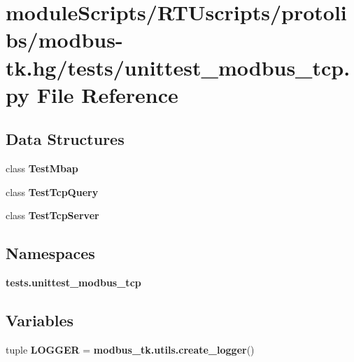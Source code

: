 \section{module\+Scripts/\+R\+T\+Uscripts/protolibs/modbus-\/tk.hg/tests/unittest\+\_\+modbus\+\_\+tcp.py File Reference}
\label{unittest__modbus__tcp_8py}
\subsection*{Data Structures}
\begin{DoxyCompactItemize}
\item 
class {\bf Test\+Mbap}
\item 
class {\bf Test\+Tcp\+Query}
\item 
class {\bf Test\+Tcp\+Server}
\end{DoxyCompactItemize}
\subsection*{Namespaces}
\begin{DoxyCompactItemize}
\item 
 {\bf tests.\+unittest\+\_\+modbus\+\_\+tcp}
\end{DoxyCompactItemize}
\subsection*{Variables}
\begin{DoxyCompactItemize}
\item 
tuple {\bf L\+O\+G\+G\+E\+R} = {\bf modbus\+\_\+tk.\+utils.\+create\+\_\+logger}()
\end{DoxyCompactItemize}

